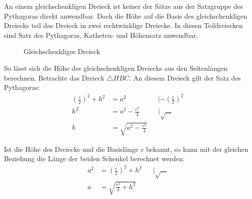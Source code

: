 \begin{folg}
 An einem gleichschenkligen Dreieck ist keiner der Sätze aus der Satzgruppe des Pythagoras direkt anwendbar. Doch die Höhe auf die Basis des gleichschenkligen Dreiecks teil das Dreieck in zwei rechtwinklige Dreiecke. In diesen Teildreiecken sind Satz des Pythagoras, Katheten- und Höhensatz anwendbar.
 \begin{figure}
  \begin{center}
  \end{center}
  \caption{Gleichschenkliges Dreieck}
 \end{figure}
 So lässt sich die Höhe des gleichschenkligen Dreiecks aus den Seitenlängen berechnen. Betrachte das Dreieck \(\triangle HBC\). An diesem Dreieck gilt der Satz des Pythagoras:
 \begin{align*}
  \left(\frac{c}{2}\right)^2 + h^2 &= a^2 &&| -\left(\frac{c}{2}\right)^2 \\
  h^2 &= a^2-\frac{c^2}{4} && | \sqrt{\ldots} \\
  h &= \sqrt{a^2-\frac{c^2}{4}}
 \end{align*}
 
 Ist die Höhe des Dreiecks und die Basislänge \(c\) bekannt, so kann mit der gleichen Beziehung die Länge der beiden Schenkel berechnet werden:
 \begin{align*}
  a^2 &= \left(\frac{c}{2}\right)^2 + h^2 &&|\sqrt{\ldots}\\
  a &= \sqrt{\frac{c^2}{4}+h^2}
 \end{align*}
\end{folg}

